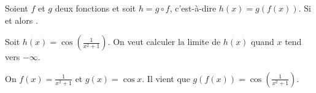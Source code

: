       \begin{thm}
            Soient $f$ et $g$ deux fonctions et soit $h = g\circ f$, c'est-\`a-dire $h(x) = g\left( f(x) \right)$.
            Si  
            et  
            alors .
            
            \begin{ex}
                  Soit $h(x) = \cos \left( \frac{1}{x^2 + 1} \right)$.
                  On veut calculer la limite de $h(x)$ quand $x$ tend vers $-\infty$.
                  
                  On $f(x) = \frac{1}{x^2 + 1}$ et $g(x) = \cos x$.
                  Il vient que $g\left(f(x)\right) = \cos \left( \frac{1}{x^2 + 1} \right)$.
                  

\end{ex}
\end{thm}

